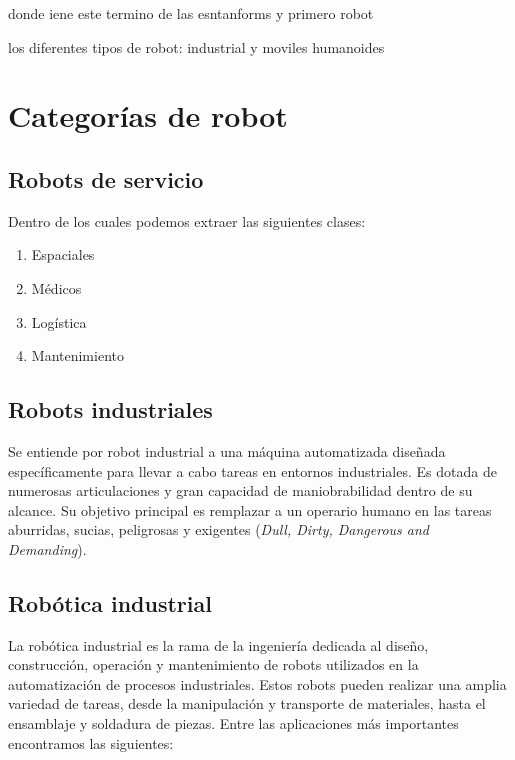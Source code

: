 donde iene este termino
de las esntanforms y primero robot

los diferentes tipos de robot: industrial y moviles humanoides

\section{Categorías de robot}
\label{sec:categorias_robots}

\subsection{Robots de servicio}
\label{sec:robot_movil} 

Dentro de los cuales podemos extraer las siguientes clases:
\begin{enumerate}
\item Espaciales

\item Médicos

\item Logística

\item Mantenimiento
\end{enumerate}

\subsection{Robots industriales}
\label{sec:robot_industrial}
Se entiende por robot industrial a una máquina automatizada diseñada específicamente para llevar a cabo tareas en entornos industriales. 
Es dotada de numerosas articulaciones y gran capacidad de maniobrabilidad dentro de su alcance. Su objetivo principal es remplazar a un 
operario humano en las tareas aburridas, sucias, peligrosas y exigentes (\textit{Dull, Dirty, Dangerous and Demanding}).


\subsection{Robótica industrial}
\label{sec:robotica_industrial}
La robótica industrial es la rama de la ingeniería dedicada al diseño, construcción, operación y mantenimiento 
de robots utilizados en la automatización de procesos industriales. Estos robots pueden realizar una amplia variedad 
de tareas, desde la manipulación y transporte de materiales, hasta el ensamblaje y soldadura de piezas. Entre las aplicaciones 
más importantes encontramos las siguientes:

